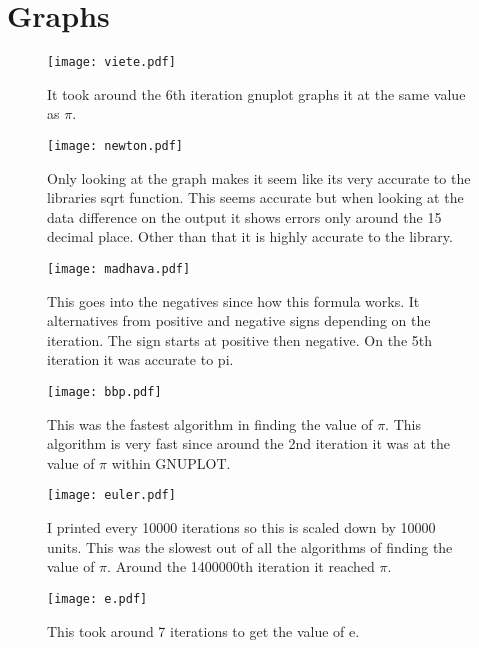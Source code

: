 \documentclass{article}
\begin{document}
\section{Graphs}
\begin{figure}[htp]
    \centering
    \texttt{[image: viete.pdf]}
    \caption{It took around the 6th iteration gnuplot graphs it at the same value as $\pi$. }
\end{figure}
\begin{figure}[htp]
    \centering
    \texttt{[image: newton.pdf]}
    \caption{Only looking at the graph makes it seem like its very accurate to the libraries sqrt function. This seems accurate but when looking at the data difference on the output it shows errors only around the 15 decimal place. Other than that it is highly accurate to the library.}
\end{figure}
\begin{figure}[htp]
    \centering
    \texttt{[image: madhava.pdf]}
    \caption{This goes into the negatives since how this formula works. It alternatives from positive and negative signs depending on the iteration. The sign starts at positive then negative. On the 5th iteration it was accurate to pi.}
\end{figure}
\begin{figure}[htp]
    \centering
    \texttt{[image: bbp.pdf]}
    \caption{This was the fastest algorithm in finding the value of $\pi$. This algorithm is very fast since around the 2nd iteration it was at the value of $\pi$ within GNUPLOT.}
\end{figure}
\begin{figure}[htp]
    \centering
    \texttt{[image: euler.pdf]}
    \caption{I printed every 10000 iterations so this is scaled down by 10000 units. This was the slowest out of all the algorithms of finding the value of $\pi$. Around the 1400000th iteration it reached $\pi$.}
\end{figure}
\begin{figure}[htp]
    \centering
    \texttt{[image: e.pdf]}
    \caption{This took around 7 iterations to get the value of e.}
\end{figure}
\end{document}
